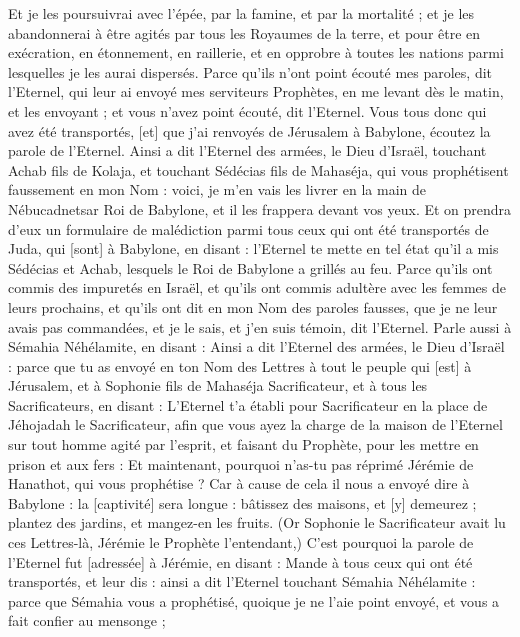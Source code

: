 \begin{multicols}{2}
Et je les poursuivrai avec l'épée, par la famine, et par la mortalité ; et je les abandonnerai à être agités par tous les Royaumes de la terre, et pour être en exécration, en étonnement, en raillerie, et en opprobre à toutes les nations parmi lesquelles je les aurai dispersés.
Parce qu'ils n'ont point écouté mes paroles, dit l'Eternel, qui leur ai envoyé mes serviteurs Prophètes, en me levant dès le matin, et les envoyant ; et vous n'avez point écouté, dit l'Eternel.
Vous tous donc qui avez été transportés, [et] que j'ai renvoyés de Jérusalem à Babylone, écoutez la parole de l'Eternel.
Ainsi a dit l'Eternel des armées, le Dieu d'Israël, touchant Achab fils de Kolaja, et touchant Sédécias fils de Mahaséja, qui vous prophétisent faussement en mon Nom : voici, je m'en vais les livrer en la main de Nébucadnetsar Roi de Babylone, et il les frappera devant vos yeux.
Et on prendra d'eux un formulaire de malédiction parmi tous ceux qui ont été transportés de Juda, qui [sont] à Babylone, en disant : l'Eternel te mette en tel état qu'il a mis Sédécias et Achab, lesquels le Roi de Babylone a grillés au feu.
Parce qu'ils ont commis des impuretés en Israël, et qu'ils ont commis adultère avec les femmes de leurs prochains, et qu'ils ont dit en mon Nom des paroles fausses, que je ne leur avais pas commandées, et je le sais, et j'en suis témoin, dit l'Eternel.
Parle aussi à Sémahia Néhélamite, en disant :
Ainsi a dit l'Eternel des armées, le Dieu d'Israël : parce que tu as envoyé en ton Nom des Lettres à tout le peuple qui [est] à Jérusalem, et à Sophonie fils de Mahaséja Sacrificateur, et à tous les Sacrificateurs, en disant :
L'Eternel t'a établi pour Sacrificateur en la place de Jéhojadah le Sacrificateur, afin que vous ayez la charge de la maison de l'Eternel sur tout homme agité par l'esprit, et faisant du Prophète, pour les mettre en prison et aux fers :
Et maintenant, pourquoi n'as-tu pas réprimé Jérémie de Hanathot, qui vous prophétise ?
Car à cause de cela il nous a envoyé dire à Babylone : la [captivité] sera longue : bâtissez des maisons, et [y] demeurez ; plantez des jardins, et mangez-en les fruits.
(Or Sophonie le Sacrificateur avait lu ces Lettres-là, Jérémie le Prophète l'entendant,)
C'est pourquoi la parole de l'Eternel fut [adressée] à Jérémie, en disant :
Mande à tous ceux qui ont été transportés, et leur dis : ainsi a dit l'Eternel touchant Sémahia Néhélamite : parce que Sémahia vous a prophétisé, quoique je ne l'aie point envoyé, et vous a fait confier au mensonge ;

\end{multicols}
